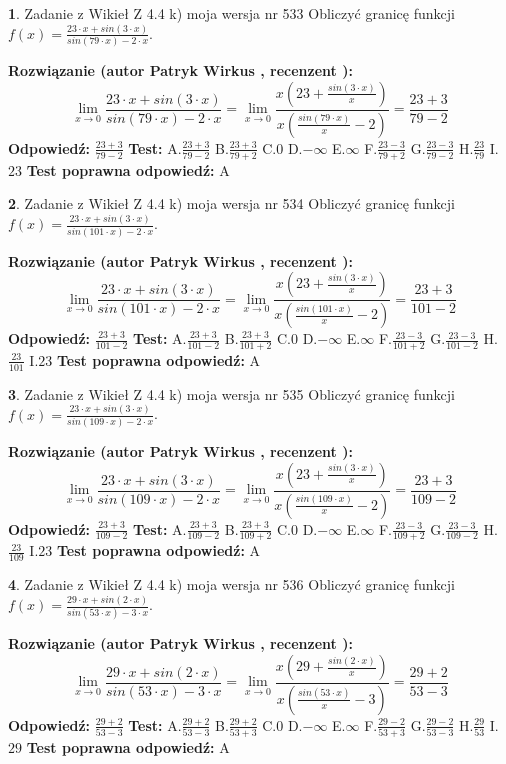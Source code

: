 \documentclass[12pt, a4paper]{article}
\theoremstyle{definition} %
\newtheorem{zad}{}
\newcommand{\zadStart}[1]{\begin{zad}#1\newline}
\newcommand{\zadStop}{\end{zad}}
\newcommand{\rozwStart}[2]{\noindent \textbf{Rozwiązanie (autor #1 , recenzent #2): }\newline}
\newcommand{\rozwStop}{\newline}
\newcommand{\odpStart}{\noindent \textbf{Odpowiedź:}\newline}
\newcommand{\odpStop}{\newline}
\newcommand{\testStart}{\noindent \textbf{Test:}\newline}
\newcommand{\testStop}{\newline}
\newcommand{\kluczStart}{\noindent \textbf{Test poprawna odpowiedź:}\newline}
\newcommand{\kluczStop}{\newline}
\begin{document}
\zadStart{Zadanie z Wikieł Z 4.4 k) moja wersja nr 533}
Obliczyć granicę funkcji $f(x)=\frac{23\cdot x +sin(3\cdot x)}{sin(79\cdot x) -2\cdot x}$.
\zadStop
\rozwStart{Patryk Wirkus}{}
$$\lim\limits_{x\to 0}\frac{23\cdot x +sin(3\cdot x)}{sin(79\cdot x) -2\cdot x}
=\lim\limits_{x\to 0}\frac{x(23+\frac{sin(3\cdot x)}{x})}{x(\frac{sin(79\cdot x)}{x}-2)}
=\frac{23+3}{79-2}$$
\rozwStop
\odpStart
$\frac{23+3}{79-2}$
\odpStop
\testStart
A.$\frac{23+3}{79-2}$
B.$\frac{23+3}{79+2}$
C.$0$
D.$-\infty$
E.$\infty$
F.$\frac{23-3}{79+2}$
G.$\frac{23-3}{79-2}$
H.$\frac{23}{79}$
I.$23$
\testStop
\kluczStart
A
\kluczStop



\zadStart{Zadanie z Wikieł Z 4.4 k) moja wersja nr 534}
Obliczyć granicę funkcji $f(x)=\frac{23\cdot x +sin(3\cdot x)}{sin(101\cdot x) -2\cdot x}$.
\zadStop
\rozwStart{Patryk Wirkus}{}
$$\lim\limits_{x\to 0}\frac{23\cdot x +sin(3\cdot x)}{sin(101\cdot x) -2\cdot x}
=\lim\limits_{x\to 0}\frac{x(23+\frac{sin(3\cdot x)}{x})}{x(\frac{sin(101\cdot x)}{x}-2)}
=\frac{23+3}{101-2}$$
\rozwStop
\odpStart
$\frac{23+3}{101-2}$
\odpStop
\testStart
A.$\frac{23+3}{101-2}$
B.$\frac{23+3}{101+2}$
C.$0$
D.$-\infty$
E.$\infty$
F.$\frac{23-3}{101+2}$
G.$\frac{23-3}{101-2}$
H.$\frac{23}{101}$
I.$23$
\testStop
\kluczStart
A
\kluczStop



\zadStart{Zadanie z Wikieł Z 4.4 k) moja wersja nr 535}
Obliczyć granicę funkcji $f(x)=\frac{23\cdot x +sin(3\cdot x)}{sin(109\cdot x) -2\cdot x}$.
\zadStop
\rozwStart{Patryk Wirkus}{}
$$\lim\limits_{x\to 0}\frac{23\cdot x +sin(3\cdot x)}{sin(109\cdot x) -2\cdot x}
=\lim\limits_{x\to 0}\frac{x(23+\frac{sin(3\cdot x)}{x})}{x(\frac{sin(109\cdot x)}{x}-2)}
=\frac{23+3}{109-2}$$
\rozwStop
\odpStart
$\frac{23+3}{109-2}$
\odpStop
\testStart
A.$\frac{23+3}{109-2}$
B.$\frac{23+3}{109+2}$
C.$0$
D.$-\infty$
E.$\infty$
F.$\frac{23-3}{109+2}$
G.$\frac{23-3}{109-2}$
H.$\frac{23}{109}$
I.$23$
\testStop
\kluczStart
A
\kluczStop



\zadStart{Zadanie z Wikieł Z 4.4 k) moja wersja nr 536}
Obliczyć granicę funkcji $f(x)=\frac{29\cdot x +sin(2\cdot x)}{sin(53\cdot x) -3\cdot x}$.
\zadStop
\rozwStart{Patryk Wirkus}{}
$$\lim\limits_{x\to 0}\frac{29\cdot x +sin(2\cdot x)}{sin(53\cdot x) -3\cdot x}
=\lim\limits_{x\to 0}\frac{x(29+\frac{sin(2\cdot x)}{x})}{x(\frac{sin(53\cdot x)}{x}-3)}
=\frac{29+2}{53-3}$$
\rozwStop
\odpStart
$\frac{29+2}{53-3}$
\odpStop
\testStart
A.$\frac{29+2}{53-3}$
B.$\frac{29+2}{53+3}$
C.$0$
D.$-\infty$
E.$\infty$
F.$\frac{29-2}{53+3}$
G.$\frac{29-2}{53-3}$
H.$\frac{29}{53}$
I.$29$
\testStop
\kluczStart
A
\kluczStop
\end{document}
